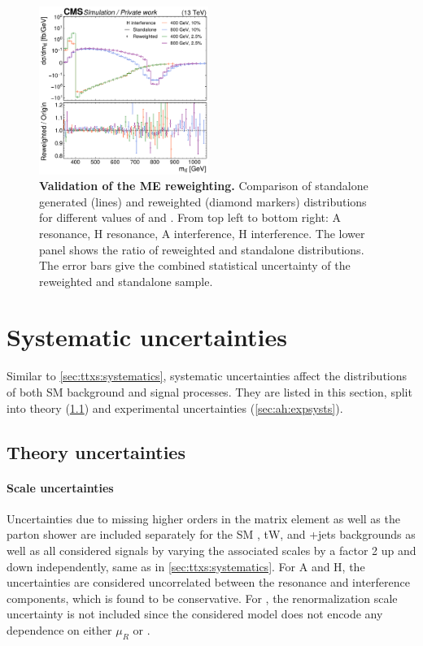 \begin{figure}[!p]
    \hfill
    \includegraphics[width=0.49\textwidth]{figures/ah/me_reweighting/H_int.pdf}
    \caption{\textbf{Validation of the ME reweighting.} Comparison of standalone generated (lines) and reweighted (diamond markers) \mtt distributions for different values of \mAH and \wAH. From top left to bottom right: A resonance, H resonance, A interference, H interference. The lower panel shows the ratio of reweighted and standalone distributions. The error bars give the combined statistical uncertainty of the reweighted and standalone sample.}
    \label{fig:ah:merew_validation}
\end{figure}

\section{Systematic uncertainties}
\label{sec:ah:systs}

Similar to \cref{sec:ttxs:systematics}, systematic uncertainties affect the distributions of both SM background and signal processes. They are listed in this section, split into theory (\cref{sec:ah:theorysysts}) and experimental uncertainties (\cref{sec:ah:expsysts}).

\subsection{Theory uncertainties}
\label{sec:ah:theorysysts}

\paragraph{Scale uncertainties}
Uncertainties due to missing higher orders in the matrix element as well as the parton shower are included separately for the SM \ttbar, tW, and \Zgamma+jets backgrounds as well as all considered signals by varying the associated scales by a factor 2 up and down independently, same as in \cref{sec:ttxs:systematics}. For A and H, the uncertainties are considered uncorrelated between the resonance and interference components, which is found to be conservative. For \etat, the renormalization scale uncertainty is not included since the considered model does not encode any dependence on either $\mu_R$ or \alphas.

